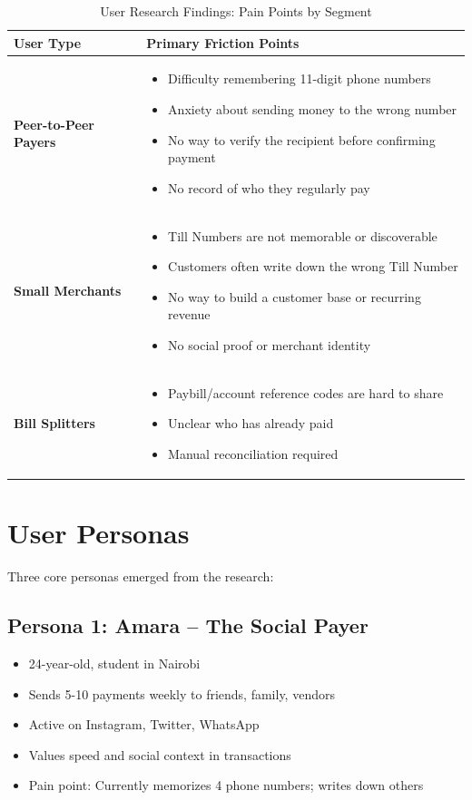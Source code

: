 \documentclass[12pt, a4paper, twoside, openright]{report}
\begin{document}
\begin{table}[H]
    \centering
    \begin{tabularx}{\textwidth}{|l|X|}
    \hline
    \textbf{User Type} & \textbf{Primary Friction Points} \\
    \hline
    \textbf{Peer-to-Peer Payers} & 
    \begin{itemize}
        \item Difficulty remembering 11-digit phone numbers
        \item Anxiety about sending money to the wrong number
        \item No way to verify the recipient before confirming payment
        \item No record of who they regularly pay
    \end{itemize} \\
    \hline
    \textbf{Small Merchants} & 
    \begin{itemize}
        \item Till Numbers are not memorable or discoverable
        \item Customers often write down the wrong Till Number
        \item No way to build a customer base or recurring revenue
        \item No social proof or merchant identity
    \end{itemize} \\
    \hline
    \textbf{Bill Splitters} & 
    \begin{itemize}
        \item Paybill/account reference codes are hard to share
        \item Unclear who has already paid
        \item Manual reconciliation required
    \end{itemize} \\
    \hline
    \end{tabularx}
    \caption{User Research Findings: Pain Points by Segment}
\end{table}

\section{User Personas}

Three core personas emerged from the research:

\subsection{Persona 1: Amara -- The Social Payer}
\begin{itemize}
    \item 24-year-old, student in Nairobi
    \item Sends 5-10 payments weekly to friends, family, vendors
    \item Active on Instagram, Twitter, WhatsApp
    \item Values speed and social context in transactions
    \item Pain point: Currently memorizes 4 phone numbers; writes down others
\end{itemize}
\end{document}
